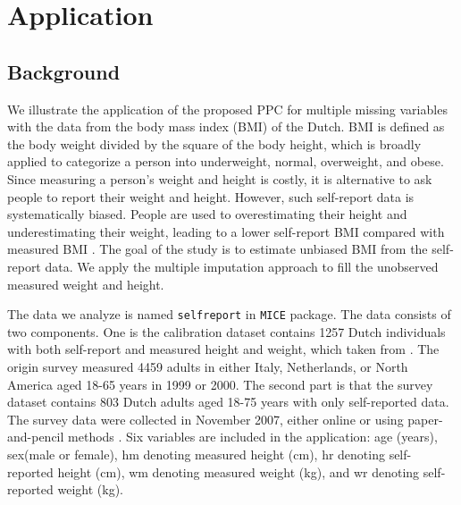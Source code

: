 	\section{Application}
	\label{sec:6.6}
	\subsection{Background}
	We illustrate the application of the proposed PPC for multiple missing variables with the data from the body mass index (BMI) of the Dutch. BMI is defined as the body weight divided by the square of the body height, which is broadly applied to categorize a person into underweight, normal, overweight, and obese. Since measuring a person's weight and height is costly, it is alternative to ask people to report their weight and height. However, such self-report data is systematically biased. People are used to overestimating their height and underestimating their weight, leading to a lower self-report BMI compared with measured BMI \citep[Section 9.3]{Buuren2018}. The goal of the study is to estimate unbiased BMI from the self-report data. We apply the multiple imputation approach to fill the unobserved measured weight and height. 
	
	The data we analyze is named \texttt{selfreport} in \texttt{MICE} package. The data consists of two components. One is the calibration dataset contains 1257 Dutch individuals with both self-report and measured height and weight, which taken from \citet{krul2011self}. The origin survey measured 4459 adults in either Italy, Netherlands, or North America aged 18-65 years in 1999 or 2000. The second part is that the survey dataset contains 803 Dutch adults aged 18-75 years with only self-reported data. The survey data were collected in November 2007, either online or using paper-and-pencil methods \citep[Section 9.3]{Buuren2018}. Six variables are included in the application: age (years), sex(male or female), hm denoting measured height (cm), hr denoting self-reported height (cm), wm denoting measured weight (kg), and wr denoting self-reported weight (kg). 
	
